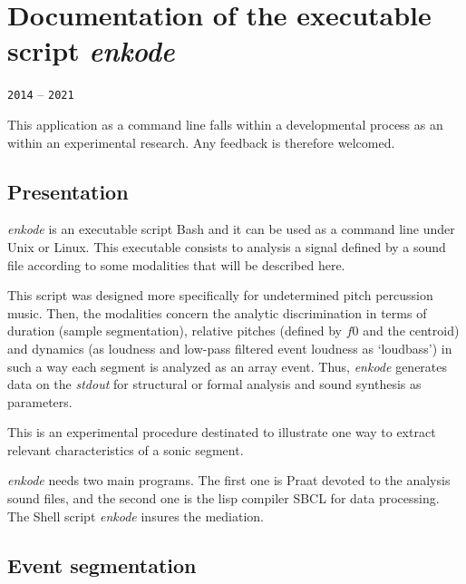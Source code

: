 \chapter{Documentation of the executable script \textsl{enkode}}
\thispagestyle{empty}
\label{enk}
{\texttt{2014} -- \texttt{2021}}

\bigskip
\smallskip
\setcounter{page}{17}

\noindent
\begin{info}
\begin{minipage}{0.95\textwidth}
\vspace{0.25cm}
This application as a command line falls within a developmental process as an  within an experimental research. Any feedback is therefore welcomed.
\vspace{0.25cm}
\end{minipage}
\end{info}

\section{Presentation}

\textsl{enkode} is an executable script Bash and it can be used as a command line under Unix or Linux. This executable consists to analysis a signal defined by a sound file according to some modalities that will be described here. 

This script was designed more specifically for undetermined pitch percussion music. Then, the modalities concern the analytic discrimination in terms of duration (sample segmentation), relative pitches (defined by $f0$ and the centroid) and dynamics (as loudness and low-pass filtered event loudness as `loudbass') in such a way each segment is analyzed as an array event. Thus, \textsl{enkode} generates data on the \textsl{stdout} for structural or formal analysis and sound synthesis as parameters.

This is an experimental procedure destinated to illustrate one way to extract relevant characteristics of a sonic segment.

\textsl{enkode} needs two main programs. The first one is Praat devoted to the analysis sound files, and the second one is the lisp compiler SBCL for data processing. The Shell script \textsl{enkode} insures the mediation.

\section{Event segmentation}
\label{enk:es}


